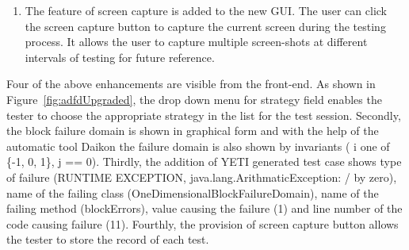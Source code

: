 \begin{enumerate}


\item The feature of screen capture is added to the new GUI. The user can click the screen capture button to capture the current screen during the testing process. It allows the user to capture multiple screen-shots at different intervals of testing for future reference. 

\end{enumerate}
\bigskip



Four of the above enhancements are visible from the front-end. As shown in Figure~\ref{fig:adfdUpgraded}, the drop down menu for strategy field enables the tester to choose the appropriate strategy in the list for the test session. Secondly, the block failure domain is shown in graphical form and with the help of the automatic tool Daikon the failure domain is also shown  by invariants ( i one of \{-1, 0, 1\}, j == 0). Thirdly, the addition of YETI generated test case shows type of failure (RUNTIME EXCEPTION, java.lang.ArithmaticException: / by zero), name of the failing class (OneDimensionalBlockFailureDomain), name of the failing method (blockErrors), value causing the failure (1) and line number of the code causing failure (11). Fourthly, the provision of screen capture button allows the tester to store the record of each test.
\clearpage
\newpage


